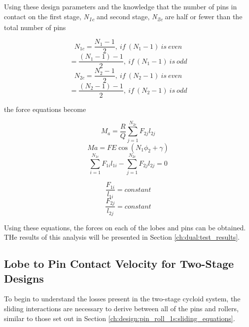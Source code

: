 Using these design parameters and the knowledge that the number of pins in contact on the first stage, \textit{N\textsubscript{1c}} and second stage, \textit{N\textsubscript{2c}} are half or fewer than the total number of pins

\begin{equation}
N_{1c} = \frac{N_{1} - 1}{2},\ if\ (N_1 -1)\ is\ even 
\end{equation}
\begin{equation}
= \frac{(N_{1}-1) - 1}{2},\ if\ (N_{1} - 1)\ is\ odd 
\end{equation}
\begin{equation}
N_{2c} = \frac{N_{2}-1}{2},\ if\ (N_{2}-1)\ is\ even 
\end{equation}
\begin{equation}
= \frac{(N_{2}-1) - 1}{2},\ if\ (N_{2}-1)\ is\ odd 
\end{equation}

the force equations become 

\begin{equation} \label{eq:dual_power}
M_a = \frac{R}{Q} \sum_{j=1}^{N_{2c}} F_{2j} l_{2j}
\end{equation}
\begin{equation} \label{eq:dual_input}
Ma = F E \cos(N_1 \phi_2 + \gamma)
\end{equation}
\begin{equation} \label{eq:dual_torqe}
\sum_{i=1}^{N_{1c}}F_{1i} l_{1i} - \sum_{j=1}^{N_{2c}}F_{2j} l_{2j} = 0
\end{equation}

\begin{equation} 
\frac{F_{1i}}{l_{1i}} = constant 
\end{equation}
\begin{equation}
\frac{F_{2j}}{l_{2j}} = constant
\end{equation}

Using these equations, the forces on each of the lobes and pins can be obtained. THe results of this analysis will be presented in Section \ref{ch:dual:test_results}.

\subsection{Lobe to Pin Contact Velocity for Two-Stage Designs}\label{ch:dual:equations:vel}
To begin to understand the losses present in the two-stage cycloid system, the sliding interactions are necessary to derive between all of the pins and rollers, similar to those set out in Section \ref{ch:design:pin_roll_1s:sliding_equations}.

